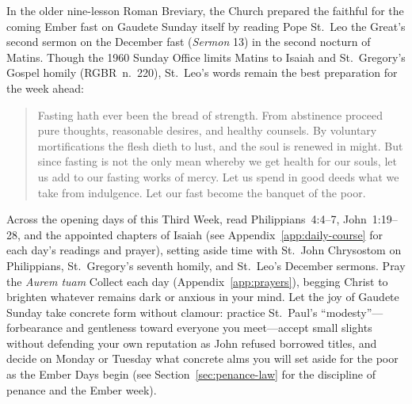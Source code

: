 In the older nine-lesson Roman Breviary, the Church prepared the
faithful for the coming Ember fast on Gaudete Sunday itself by reading
Pope St.~Leo the Great's second sermon on the December fast
(\textit{Sermon} 13) in the second nocturn of Matins. Though the 1960
Sunday Office limits Matins to Isaiah and St.~Gregory's Gospel homily
(RGBR~n.~220), St.~Leo's words remain the best preparation for the week
ahead:

\begin{quote}
Fasting hath ever been the bread of strength. From abstinence proceed
pure thoughts, reasonable desires, and healthy counsels. By voluntary
mortifications the flesh dieth to lust, and the soul is renewed in
might. But since fasting is not the only mean whereby we get health for
our souls, let us add to our fasting works of mercy. Let us spend in
good deeds what we take from indulgence. Let our fast become the banquet
of the poor.
\end{quote}

Across the opening days of this Third Week, read Philippians~4:4--7,
John~1:19--28, and the appointed chapters of Isaiah (see
Appendix~\ref{app:daily-course} for each day's readings and prayer),
setting aside time with St.~John Chrysostom on Philippians,
St.~Gregory's seventh homily, and St.~Leo's December sermons. Pray the
\textit{Aurem tuam} Collect each day (Appendix~\ref{app:prayers}),
begging Christ to brighten whatever remains dark or anxious in your
mind. Let the joy of Gaudete Sunday take concrete form without clamour:
practice St.~Paul's ``modesty''---forbearance and gentleness toward
everyone you meet---accept small slights without defending your own
reputation as John refused borrowed titles, and decide on Monday or
Tuesday what concrete alms you will set aside for the poor as the Ember
Days begin (see Section~\ref{sec:penance-law} for the discipline of
penance and the Ember week).
